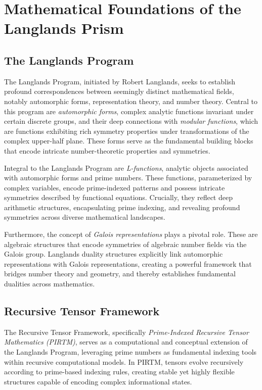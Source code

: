 \documentclass[11pt]{article}
\begin{document}
\section{Mathematical Foundations of the Langlands Prism}

\subsection{The Langlands Program}

The Langlands Program, initiated by Robert Langlands, seeks to establish profound correspondences between seemingly distinct mathematical fields, notably automorphic forms, representation theory, and number theory. Central to this program are \textit{automorphic forms}, complex analytic functions invariant under certain discrete groups, and their deep connections with \textit{modular functions}, which are functions exhibiting rich symmetry properties under transformations of the complex upper-half plane. These forms serve as the fundamental building blocks that encode intricate number-theoretic properties and symmetries.

Integral to the Langlands Program are \textit{L-functions}, analytic objects associated with automorphic forms and prime numbers. These functions, parameterized by complex variables, encode prime-indexed patterns and possess intricate symmetries described by functional equations. Crucially, they reflect deep arithmetic structures, encapsulating prime indexing, and revealing profound symmetries across diverse mathematical landscapes.

Furthermore, the concept of \textit{Galois representations} plays a pivotal role. These are algebraic structures that encode symmetries of algebraic number fields via the Galois group. Langlands duality structures explicitly link automorphic representations with Galois representations, creating a powerful framework that bridges number theory and geometry, and thereby establishes fundamental dualities across mathematics.

\subsection{Recursive Tensor Framework}

The Recursive Tensor Framework, specifically \textit{Prime-Indexed Recursive Tensor Mathematics (PIRTM)}, serves as a computational and conceptual extension of the Langlands Program, leveraging prime numbers as fundamental indexing tools within recursive computational models. In PIRTM, tensors evolve recursively according to prime-based indexing rules, creating stable yet highly flexible structures capable of encoding complex informational states.
\end{document}
